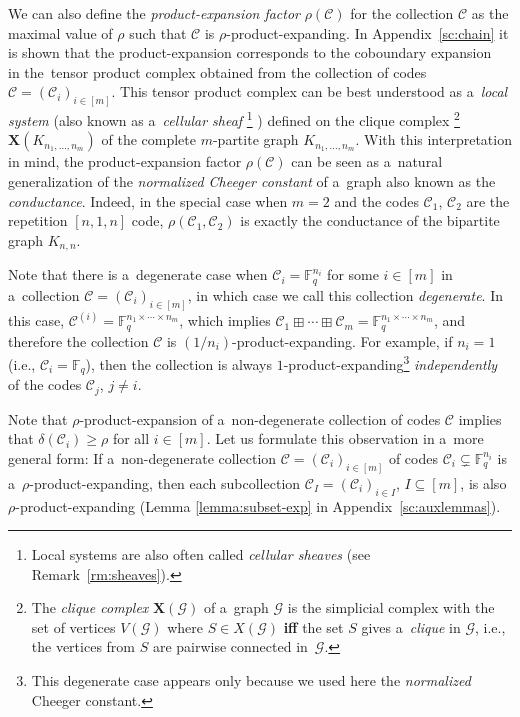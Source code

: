 \documentclass[11pt]{article}
\newcommand{\Iff}{\textbf{if\textcompwordmark f} }
\let\ge\geqslant
\theoremstyle{plain}
\newtheorem{lemma}{Lemma}
\theoremstyle{definition}
\theoremstyle{remark}
\newcommand{\cC}{\mathcal{C}}
\newcommand{\cG}{\mathcal{G}}
\newcommand{\F}{\mathbb{F}}
\begin{document}
We can also define the \emph{product-expansion factor} $\rho(\cC)$ for the collection $\cC$ as the maximal value of $\rho$ such that $\cC$ is $\rho$-product-expanding. In Appendix~\ref{sc:chain} it is shown that the product-expansion  corresponds to the coboundary expansion~\cite{Linial:2006,Gromov:2010} in the~tensor product complex obtained from the collection of codes $\cC = (\cC_i)_{i\in [m]}$. This tensor product complex can be best understood as a~\emph{local system} (also known as a~\emph{cellular sheaf}%
\footnote{Local systems are also often called \emph{cellular sheaves} (see Remark~\ref{rm:sheaves}).}%
) defined on the clique complex%
    \footnote{The \emph{clique complex} $\mathbf{X}(\cG)$ of a~graph $\cG$ is the simplicial complex with the set of vertices $V(\cG)$ where $S\in  X(\cG)$ \Iff the set $S$ gives a~\emph{clique} in $\cG$, i.e., the vertices from $S$ are pairwise connected in~$\cG$.} 
$\mathbf{X}(K_{n_1,\dots,n_m})$ of the complete $m$-partite graph $K_{n_1,\dots,n_m}$. With this interpretation in mind, the product-expansion factor $\rho(\cC)$ can be seen as a~natural generalization of the \emph{normalized Cheeger constant} of a~graph also known as the \emph{conductance}. Indeed, in the special case when $m=2$ and the codes $\cC_1$, $\cC_2$ are the repetition $[n, 1, n]$ code, $\rho(\cC_1,\cC_2)$ is exactly the conductance of the bipartite graph $K_{n,n}$.  

Note that there is a~degenerate case when $\cC_i=\F_q^{n_i}$ for some $i\in [m]$ in a~collection $\cC = (\cC_i)_{i\in [m]}$, in which case we call this collection \emph{degenerate}. In this case,  $\cC^{(i)}=\F_q^{n_1\times \cdots\times n_m}$, which implies $\cC_1\boxplus\cdots\boxplus \cC_m=\F_q^{n_1\times \cdots\times n_m}$, and therefore the collection $\cC$ is $(1/n_i)$-product-expanding. For example, if $n_i = 1$ (i.e., $\cC_i = \F_q$), then the collection is always $1$-product-expanding\footnote{This degenerate case appears only because we used here the \emph{normalized} Cheeger constant.} \emph{independently} of the codes $\cC_j$, $j\ne i$.

Note that $\rho$-product-expansion of a~non-degenerate collection of codes $\cC$ implies that $\delta(\cC_i)\ge \rho$ for all $i\in [m]$. Let us formulate this observation in a~more general form:
If a~non-degenerate collection $\cC=(\cC_i)_{i\in [m]}$ of codes $\cC_i\subsetneq \F_q^{n_i}$ is a~$\rho$-product-expanding, then each subcollection $\cC_I=(\cC_i)_{i\in I}$, $I\subseteq [m]$, is also $\rho$-product-expanding (Lemma \ref{lemma:subset-exp} in Appendix~\ref{sc:auxlemmas}).
\end{document}
